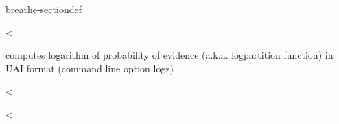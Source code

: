 \documentclass[letterpaper,10pt,openany,oneside,english]{sphinxmanual}
\begin{document}
\begin{fulllineitems}
\begin{sphinxuseclass}{breathe-sectiondef}
\begin{fulllineitems}
\end{fulllineitems}


\begin{fulllineitems}
\label{\detokenize{ref/ref_cpp:_CPPv4N8ToulBar24logZE}}\label{\detokenize{ref/ref_cpp:_CPPv3N8ToulBar24logZE}}\label{\detokenize{ref/ref_cpp:_CPPv2N8ToulBar24logZE}}\label{\detokenize{ref/ref_cpp:ToulBar2::logZ__TLogProb}}
\pysigstartsignatures
\pysigstartmultiline
{}
\pysigstopmultiline
\pysigstopsignatures
\sphinxAtStartPar
\textless{} 

\sphinxAtStartPar
computes logarithm of probability of evidence (a.k.a. log\sphinxhyphen{}partition function) in UAI format (command line option \sphinxhyphen{}logz) 

\end{fulllineitems}


\begin{fulllineitems}
\label{\detokenize{ref/ref_cpp:_CPPv4N8ToulBar24logUE}}\label{\detokenize{ref/ref_cpp:_CPPv3N8ToulBar24logUE}}\label{\detokenize{ref/ref_cpp:_CPPv2N8ToulBar24logUE}}\label{\detokenize{ref/ref_cpp:ToulBar2::logU__TLogProb}}
\pysigstartsignatures
\pysigstartmultiline
{}
\pysigstopmultiline
\pysigstopsignatures
\sphinxAtStartPar
\textless{} 

\end{fulllineitems}


\begin{fulllineitems}
\label{\detokenize{ref/ref_cpp:_CPPv4N8ToulBar210logepsilonE}}\label{\detokenize{ref/ref_cpp:_CPPv3N8ToulBar210logepsilonE}}\label{\detokenize{ref/ref_cpp:_CPPv2N8ToulBar210logepsilonE}}\label{\detokenize{ref/ref_cpp:ToulBar2::logepsilon__TLogProb}}
\pysigstartsignatures
\pysigstartmultiline
{}
\pysigstopmultiline
\pysigstopsignatures
\sphinxAtStartPar
\textless{} 


\end{fulllineitems}
\end{sphinxuseclass}
\end{fulllineitems}
\end{document}
